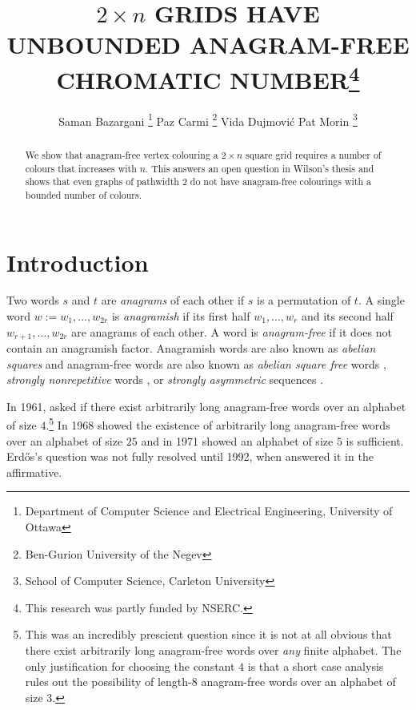 \documentclass{patmorin}
\title{\MakeUppercase{$2\times n$ Grids have Unbounded Anagram-Free Chromatic Number}\thanks{This research was partly funded by NSERC.}}
\author{Saman Bazargani%
    \thanks{Department of Computer Science and Electrical Engineering, University of Ottawa}\qquad
    Paz Carmi%
    \thanks{Ben-Gurion University of the Negev}\qquad
    Vida Dujmović\footnotemark[2]\qquad
    Pat Morin%
    \thanks{School of Computer Science, Carleton University}}
\date{}
\begin{document}
\maketitle

\begin{abstract}
    We show that anagram-free vertex colouring a $2\times n$ square grid requires a number of colours that increases with $n$.  This answers an open question in Wilson's thesis and shows that even graphs of pathwidth $2$ do not have anagram-free colourings with a bounded number of colours.
\end{abstract}

%



\section{Introduction}

Two words $s$ and $t$ are \emph{anagrams} of each other if $s$ is a permutation of $t$.  A single word $w:=w_1,\ldots,w_{2r}$ is \emph{anagramish} if its first half $w_1,\ldots,w_r$ and its second half $w_{r+1},\ldots,w_{2r}$ are anagrams of each other.  A word is \emph{anagram-free} if it does not contain an anagramish factor.  Anagramish words are also known as \emph{abelian squares} and anagram-free words are also known as \emph{abelian square free} words \cite{keranen:abelian,keranen:powerful}, \emph{strongly nonrepetitive} words \cite{pleasants:non-repetitive}, or \emph{strongly asymmetric} sequences \cite{evdokimov:strongly,evdokimov:strongly2}.

In 1961, \citet{erdos:some} asked if there exist arbitrarily long anagram-free words over an alphabet of size $4$.\footnote{This was an incredibly prescient question since it is not at all obvious that there exist arbitrarily long anagram-free words over \emph{any} finite alphabet. The only justification for choosing the constant $4$ is that a short case analysis rules out the possibility of length-$8$ anagram-free words over an alphabet of size $3$.}  In 1968 \citet{evdokimov:strongly,evdokimov:strongly2} showed the existence of arbitrarily long anagram-free words over an alphabet of size $25$ and in 1971 \citet{pleasants:non-repetitive} showed an alphabet of size $5$ is sufficient.  Erd\H{o}s's question was not fully resolved until 1992, when \citet{keranen:abelian} answered it in the affirmative.
\end{document}
